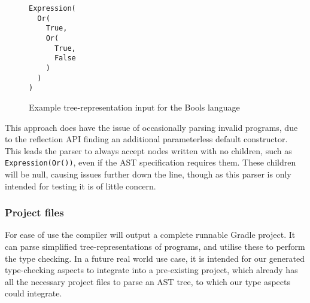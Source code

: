 \documentclass[nofilelist]{cslthse-msc}
\newcommand{\CR}[1]{\textcolor{green!60!black}{[\textbf{CR}:#1]}}
\begin{document}
\begin{figure}[h]
\begin{lstlisting}[]
Expression(
  Or(
    True,
    Or(
      True,
      False
    )
  )
)
\end{lstlisting}
  \caption{Example tree-representation input for the Bools language}
  \label{boolinputexample}
\end{figure}

This approach does have the issue of occasionally parsing invalid programs, due to the reflection API finding an additional parameterless default constructor.
This leads the parser to always accept nodes written with no children, such as \lstinline{Expression(Or())}, even if the AST specification requires them.
These children will be null, causing issues further down the line, though as this parser is only intended for testing it is of little concern.

\subsubsection{Project files}\label{projectfiles}
For ease of use the compiler will output a complete runnable Gradle project.
It can parse simplified tree-representations of programs, and utilise these to perform the type checking.
In a future real world use case, it is intended for our generated type-checking aspects to integrate into a pre-existing project, which already has all the necessary project files to parse an AST tree, to which our type aspects could integrate.

\end{document}
